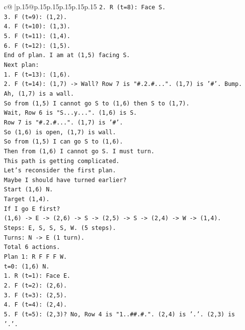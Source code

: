 \documentclass{article}
\begin{document}
{\begin{supertabular}{c@{$\;$}|p{.15\linewidth}@{}p{.15\linewidth}p{.15\linewidth}p{.15\linewidth}p{.15\linewidth}p{.15\linewidth}}
{{{\texttt{2. R (t=8): Face S.} \\
\texttt{3. F (t=9): (1,2).} \\
\texttt{4. F (t=10): (1,3).} \\
\texttt{5. F (t=11): (1,4).} \\
\texttt{6. F (t=12): (1,5).} \\
\texttt{End of plan. I am at (1,5) facing S.} \\
\texttt{Next plan:} \\
\texttt{1. F (t=13): (1,6).} \\
\texttt{2. F (t=14): (1,7) {-}> Wall? Row 7 is "\#.2.\#...". (1,7) is '\#'. Bump.} \\
\texttt{Ah, (1,7) is a wall.} \\
\texttt{So from (1,5) I cannot go S to (1,6) then S to (1,7).} \\
\texttt{Wait, Row 6 is "S...y...". (1,6) is S.} \\
\texttt{Row 7 is "\#.2.\#...". (1,7) is '\#'.} \\
\texttt{So (1,6) is open, (1,7) is wall.} \\
\texttt{So from (1,5) I can go S to (1,6).} \\
\texttt{Then from (1,6) I cannot go S. I must turn.} \\
\texttt{This path is getting complicated.} \\
\texttt{Let's reconsider the first plan.} \\
\texttt{Maybe I should have turned earlier?} \\
\texttt{Start (1,6) N.} \\
\texttt{Target (1,4).} \\
\texttt{If I go E first?} \\
\texttt{(1,6) {-}> E {-}> (2,6) {-}> S {-}> (2,5) {-}> S {-}> (2,4) {-}> W {-}> (1,4).} \\
\texttt{Steps: E, S, S, S, W. (5 steps).} \\
\texttt{Turns: N {-}> E (1 turn).} \\
\texttt{Total 6 actions.} \\
\texttt{Plan 1: R F F F W.} \\
\texttt{t=0: (1,6) N.} \\
\texttt{1. R (t=1): Face E.} \\
\texttt{2. F (t=2): (2,6).} \\
\texttt{3. F (t=3): (2,5).} \\
\texttt{4. F (t=4): (2,4).} \\
\texttt{5. F (t=5): (2,3)? No, Row 4 is "1..\#\#.\#.". (2,4) is '.'. (2,3) is '.'.} \\
}}}
\end{supertabular}}
\end{document}
